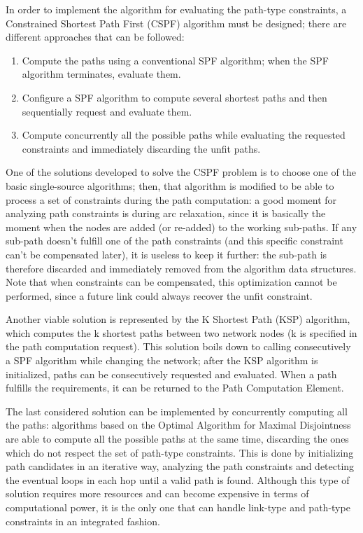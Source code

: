 \documentclass[10pt,a4paper]{report}
\begin{document}
In order to implement the algorithm for evaluating the path-type
constraints, a Constrained Shortest Path First (CSPF) algorithm must
be designed; there are different approaches that can be followed:
\begin{enumerate}
\item Compute the paths using a conventional SPF algorithm; when the
  SPF algorithm terminates, evaluate them.
\item Configure a SPF algorithm to compute several shortest paths and then
  sequentially request and evaluate them.
\item Compute concurrently all the possible paths while evaluating the
  requested constraints and immediately discarding the unfit paths.
\end{enumerate}

One of the solutions developed to solve the CSPF problem is to choose
one of the basic single-source algorithms; then, that algorithm is
modified to be able to process a set of constraints during the path
computation: a good moment for analyzing path constraints is during
arc relaxation, since it is basically the moment when the nodes are
added (or re-added) to the working sub-paths. If any sub-path doesn't
fulfill one of the path constraints (and this specific constraint
can't be compensated later), it is useless to keep it further: the
sub-path is therefore discarded and immediately removed from the
algorithm data structures. Note that when constraints can be
compensated, this optimization cannot be performed, since a future
link could always recover the unfit constraint.

Another viable solution is represented by the K Shortest Path (KSP)
algorithm, which computes the k shortest paths between two network
nodes (k is specified in the path computation request). This solution
boils down to calling consecutively a SPF algorithm while changing the
network; after the KSP algorithm is initialized, paths can be
consecutively requested and evaluated. When a path fulfills the
requirements, it can be returned to the Path Computation Element.

The last considered solution can be implemented by concurrently
computing all the paths: algorithms based on the Optimal Algorithm for
Maximal Disjointness are able to compute all the possible paths at the
same time, discarding the ones which do not respect the set of
path-type constraints. This is done by initializing path candidates in
an iterative way, analyzing the path constraints and detecting the
eventual loops in each hop until a valid path is found. Although this
type of solution requires more resources and can become expensive in
terms of computational power, it is the only one that can handle
link-type and path-type constraints in an integrated fashion.
\end{document}
